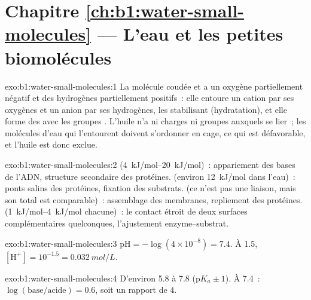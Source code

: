 \section*{Chapitre \ref{ch:b1:water-small-molecules} --- L'eau et les petites biomolécules}

\begin{solution}{exo:b1:water-small-molecules:1}
La molécule coudée et  a un oxygène partiellement négatif et des
hydrogènes partiellement positifs~: elle entoure un cation par ses
oxygènes et un anion par ses hydrogènes, les stabilisant (hydratation),
et elle forme des  avec les groupes . L'huile
n'a ni charges ni groupes  auxquels se lier~; les molécules
d'eau qui l'entourent doivent s'ordonner en cage, ce qui est
défavorable, et l'huile est donc exclue.
\end{solution}

\begin{solution}{exo:b1:water-small-molecules:2}
 (\qtyrange{4}{20}{kJ/mol})~: appariement des bases de
l'ADN, structure secondaire des protéines.  (environ
\qty{12}{kJ/mol} dans l'eau)~: ponts salins des protéines, fixation des
substrats.  (ce n'est pas une liaison, mais son total
est comparable)~: assemblage des membranes, repliement des protéines.
 (\qtyrange{1}{4}{kJ/mol} chacune)~: le contact étroit de
deux surfaces complémentaires quelconques, l'ajustement
enzyme--substrat.
\end{solution}

\begin{solution}{exo:b1:water-small-molecules:3}
$\mathrm{pH} = -\log(4\times 10^{-8}) = 7.4$. À  1.5,
$[\mathrm{H^+}] = 10^{-1.5} = \qty{0.032}{mol/L}$.
\end{solution}

\begin{solution}{exo:b1:water-small-molecules:4}
D'environ 5.8 à 7.8 (p$K_a \pm 1$). À 7.4~: $\log(\text{base}/\text{acide})
= 0.6$, soit un rapport de $4$.
\end{solution}

